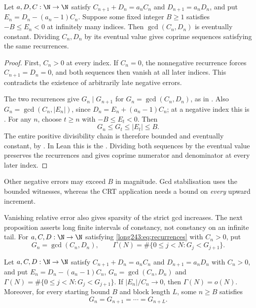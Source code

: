 \begin{proposition}\label{long243:res:gcdstab}
Let $a,D,C:\N\to\N$ satisfy $C_{n+1}+D_n=a_nC_n$ and
$D_{n+1}=a_nD_n$, and put $E_n=D_n-(a_n-1)C_n$. Suppose some fixed integer $B\ge1$ satisfies
$-B\le E_n<0$ at infinitely many indices. Then
$\gcd(C_n,D_n)$ is eventually constant. Dividing $C_n,D_n$ by its
eventual value gives coprime sequences satisfying the same recurrences.
\end{proposition}

\begin{proof}
First, $C_n>0$ at every index. If $C_n=0$, the nonnegative recurrence
forces $C_{n+1}=D_n=0$, and both sequences then vanish at all later
indices. This contradicts the existence of arbitrarily late negative
errors.

The two recurrences give $G_n\mid G_{n+1}$ for
$G_n=\gcd(C_n,D_n)$, as in
.
Also $G_n=\gcd(C_n,|E_n|)$, since $D_n=E_n+(a_n-1)C_n$;
at a negative index this is
.
For any $n$, choose $t\ge n$ with $-B\le E_t<0$. Then
\[
 G_n\le G_t\le |E_t|\le B.
\]
The entire positive divisibility chain is therefore bounded and eventually
constant, by
.
In Lean this is the
.
Dividing both sequences by the eventual value preserves the recurrences
and gives coprime numerator and denominator at every later index.
\end{proof}

Other negative errors may exceed $B$ in magnitude. Gcd stabilisation
uses the bounded witnesses, whereas the CRT application needs a bound
on \emph{every} upward increment.

Vanishing relative error also gives sparsity of the strict gcd increases.
The next proposition asserts long finite intervals of constancy, not
constancy on an infinite tail.
For $a,C,D:\N\to\N$ satisfying \eqref{long243:eq:recurrences} with $C_n>0$, put
\[
 G_n=\gcd(C_n,D_n),\qquad
 \Gamma(N)=\#\{0\le j<N:G_j<G_{j+1}\}.
\]

\begin{proposition}
\label{long243:res:gcdsparse}
Let $a,C,D:\N\to\N$ satisfy $C_{n+1}+D_n=a_nC_n$ and $D_{n+1}=a_nD_n$ with
$C_n>0$, and put $E_n=D_n-(a_n-1)C_n$, $G_n=\gcd(C_n,D_n)$ and
$\Gamma(N)=\#\{0\le j<N:G_j<G_{j+1}\}$.  If $|E_n|/C_n\to0$, then
$\Gamma(N)=o(N)$.  Moreover, for every starting bound $B$ and block length
$L$, some $n\ge B$ satisfies
\[
  G_n=G_{n+1}=\cdots=G_{n+L}.
\]
\end{proposition}

